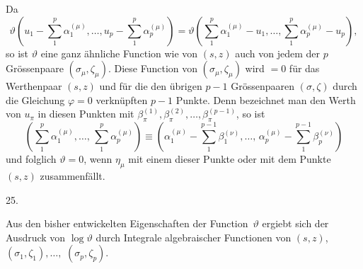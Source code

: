 \documentclass[a4paper,12pt,leqno]{article}
\begin{document}
Da
\[ \vartheta
      \left(
         u_1 - \sum_1^p \alpha_1^{(\mu)},\ldots,
         u_p - \sum_1^p \alpha_p^{(\mu)}
      \right)
   = \vartheta
      \left(
         \sum_1^p \alpha_1^{(\mu)} - u_1,\ldots,
         \sum_1^p \alpha_p^{(\mu)} - u_p
      \right),\]
so ist $\vartheta$ eine ganz \"{a}hnliche Function wie von
$(s,z)$ auch von jedem der $p$ Gr\"{o}ssenpaare
$(\sigma_\mu, \zeta_\mu)$.  Diese Function von
$(\sigma_\mu, \zeta_\mu)$ wird $= 0$ f\"{u}r das Werth\-enpaar
$(s,z)$ und f\"{u}r die den \"{u}brigen $p - 1$ Gr\"{o}ssenpaaren
$(\sigma, \zeta)$ durch die Gleichung $\varphi = 0$
verkn\"{u}pften $p - 1$ Punkte.  Denn bezeichnet man den Werth
von $u_\pi$ in diesen Punkten mit
$\beta_\pi^{(1)}, \beta_\pi^{(2)},\ldots, \beta_\pi^{(p-1)}$,
so ist
\[       \left(
            \sum_1^p \alpha_1^{(\mu)},\ldots, \,
            \sum_1^p \alpha_p^{(\mu)}
         \right)
   \equiv
         \left(
            \alpha_1^{(\mu)} - \sum_1^{p - 1} \beta_1^{(\nu)},\ldots, \,
            \alpha_p^{(\mu)} - \sum_1^{p - 1} \beta_p^{(\nu)}
         \right) \]
und folglich $\vartheta = 0$, wenn $\eta_\mu$ mit einem dieser
Punkte oder mit dem Punkte $(s,z)$ zusammenf\"{a}llt.

\medbreak

\centerline{25.}

\nobreak\medskip

Aus den bisher entwickelten Eigenschaften der
Function~$\vartheta$ ergiebt sich der Ausdruck von
$\log \vartheta$ durch Integrale algebraischer Functionen von
$(s,z)$, $(\sigma_1, \zeta_1),\ldots,$ $(\sigma_p, \zeta_p)$.
\end{document}
